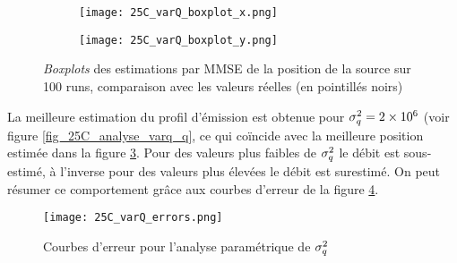 \begin{figure}[h!]
	\centering
         	\begin{subfigure}[t]{0.5\textwidth}
         		\centering
         		\texttt{[image: 25C\_varQ\_boxplot\_x.png]}
         		\caption{}
         		\label{varQ_boxplot_x}
         	\end{subfigure}%
         \begin{subfigure}[t]{0.5\textwidth}
         	\centering
         	\texttt{[image: 25C\_varQ\_boxplot\_y.png]}
         	\caption{}
         	\label{varQ_boxplot_y}
         \end{subfigure}%
         \caption{\textit{Boxplots} des estimations par MMSE de la position de la source sur 100 runs, comparaison avec les valeurs réelles (en pointillés noirs)}
         \label{fig_25C_varQ_boxplots}
	
\end{figure}

La meilleure estimation du profil d'émission est obtenue pour $\sigma_q^2=2\times 10^6$ (voir figure \ref{fig_25C_analyse_varq_q}, ce qui coïncide avec la meilleure position estimée dans la figure \ref{fig_25C_varQ_boxplots}. Pour des valeurs plus faibles de $\sigma_q^2$ le débit est sous-estimé, à l'inverse pour des valeurs plus élevées le débit est surestimé. On peut résumer ce comportement grâce aux courbes d'erreur de la figure \ref{fig_25C_varq_erreurs}.

         \begin{figure}[h!]
         	\centering
         	\texttt{[image: 25C\_varQ\_errors.png]}
         	\caption{Courbes d'erreur pour l'analyse paramétrique de $\sigma_q^2$}
         	\label{fig_25C_varq_erreurs}
         \end{figure}
 



